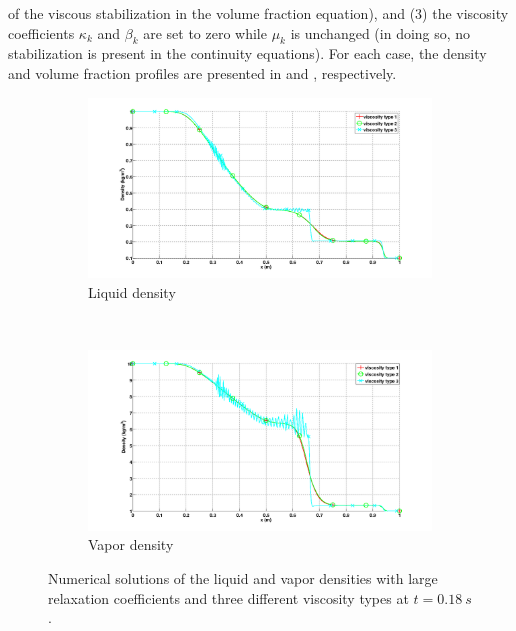 \documentclass[preprint,10pt]{elsarticle}
\begin{document}
of the viscous stabilization in the volume fraction equation), and 
(3) the viscosity coefficients $\kappa_k$ and $\beta_k$ are set to zero while $\mu_k$ is unchanged (in doing so, no stabilization is present 
in the continuity equations). For each case, the density and volume fraction profiles are presented in  and , respectively.
%
\begin{figure}[H]
        \centering
        \begin{subfigure}[b]{0.95\textwidth}
                \centering
                \includegraphics[width=\textwidth]{../figures/paper/relaxation_vapor_density_multiple_visc.png}
                \caption{Liquid density}
                \label{fig:liq-density}
        \end{subfigure}
				\\
        \begin{subfigure}[b]{0.95\textwidth}
                \centering
                \includegraphics[width=\textwidth]{../figures/paper/relaxation_liquid_density_multiple_visc.png}
                \caption{Vapor density}
                \label{fig:vap-density}
        \end{subfigure}
        \caption{Numerical solutions of the liquid and vapor densities with large relaxation coefficients and three different viscosity types at $t=0.18 \ s$.}\label{fig:density}
\end{figure}
\end{document}
